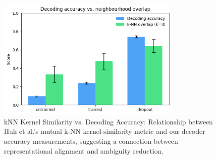 \documentclass[11pt]{article}
\begin{document}
\begin{figure}[htbp]
\centering
\includegraphics[width=0.8\textwidth]{figures/knn-kernel-similarity-vs-decoder-accuracy.png}
\caption{kNN Kernel Similarity vs. Decoding Accuracy: Relationship between Huh et al.'s mutual k-NN kernel-similarity metric and our decoder accuracy measurements, suggesting a connection between representational alignment and ambiguity reduction.}
\label{fig:knn-similarity}
\end{figure}




\end{document}
